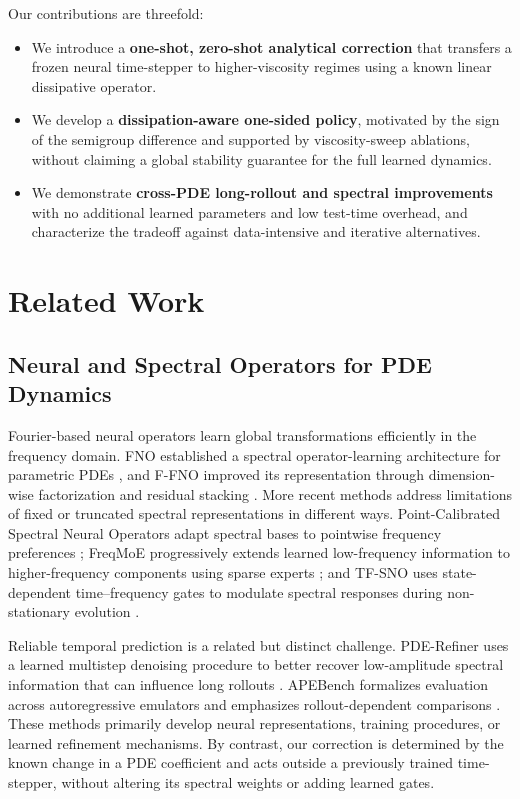 \documentclass[10pt,twocolumn]{article}
\begin{document}
Our contributions are threefold:
\begin{itemize}
    \item We introduce a \textbf{one-shot, zero-shot analytical correction} that transfers a frozen neural time-stepper to higher-viscosity regimes using a known linear dissipative operator.

    \item We develop a \textbf{dissipation-aware one-sided policy}, motivated by the sign of the semigroup difference and supported by viscosity-sweep ablations, without claiming a global stability guarantee for the full learned dynamics.

    \item We demonstrate \textbf{cross-PDE long-rollout and spectral improvements} with no additional learned parameters and low test-time overhead, and characterize the tradeoff against data-intensive and iterative alternatives.
\end{itemize}


\section{Related Work}
\label{sec:related_work}

\subsection{Neural and Spectral Operators for PDE Dynamics}

Fourier-based neural operators learn global transformations efficiently in the frequency domain. FNO established a spectral operator-learning architecture for parametric PDEs \cite{li2021fno}, and F-FNO improved its representation through dimension-wise factorization and residual stacking \cite{tran2023ffno}. More recent methods address limitations of fixed or truncated spectral representations in different ways. Point-Calibrated Spectral Neural Operators adapt spectral bases to pointwise frequency preferences \cite{yue2024pcsm}; FreqMoE progressively extends learned low-frequency information to higher-frequency components using sparse experts \cite{chen2025freqmoe}; and TF-SNO uses state-dependent time--frequency gates to modulate spectral responses during non-stationary evolution \cite{zhou2026tfsno}.

Reliable temporal prediction is a related but distinct challenge. PDE-Refiner uses a learned multistep denoising procedure to better recover low-amplitude spectral information that can influence long rollouts \cite{lippe2023pderefiner}. APEBench formalizes evaluation across autoregressive emulators and emphasizes rollout-dependent comparisons \cite{koehler2024apebench}. These methods primarily develop neural representations, training procedures, or learned refinement mechanisms. By contrast, our correction is determined by the known change in a PDE coefficient and acts outside a previously trained time-stepper, without altering its spectral weights or adding learned gates.
\end{document}
